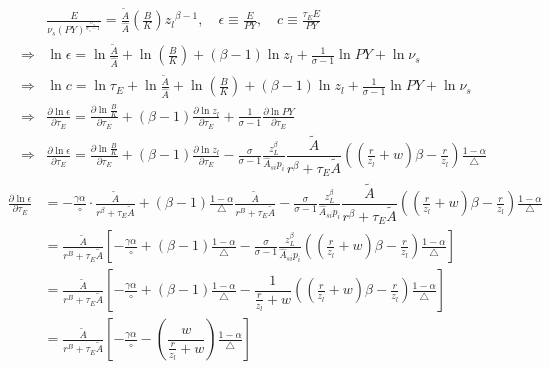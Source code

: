 \documentclass[12pt]{article} %
\begin{document}
\begin{enumerate}
    \begin{align*}
        & \frac{E}{\nu_{s}(PY)^{\frac{\sigma_s}{\sigma_s - 1}}}  = \frac{\tilde{A}}{\hat{A}}(\frac{B}{K}) {{z_l}}^{\beta-1} , \quad \epsilon \equiv  \frac{E}{PY}, \quad c \equiv \frac{\tau_E E}{PY}\\
        \Rightarrow & \ln \epsilon =  \ln \frac{\tilde{A}}{\hat{A}} + \ln(\frac{B}{K}) + (\beta-1) \ln {{z_l}} + \frac{1}{\sigma -1} \ln PY + \ln \nu_{s} \\
        \Rightarrow & \ln c = \ln \tau_E + \ln \frac{\tilde{A}}{\hat{A}} + \ln(\frac{B}{K}) + (\beta-1) \ln {{z_l}} + \frac{1}{\sigma -1} \ln PY + \ln \nu_{s}
        \\
        \Rightarrow & \frac{\partial \ln \epsilon}{\partial \tau_E} =   \frac{\partial \ln \frac{B}{K} }{\partial \tau_E} 
        + (\beta - 1) \frac{\partial \ln z_l }{\partial \tau_E} + \frac{1}{\sigma -1} \frac{\partial\ln PY }{\partial \tau_E}\\
        \Rightarrow & \frac{\partial \ln \epsilon}{\partial \tau_E} =   \frac{\partial \ln \frac{B}{K} }{\partial \tau_E}
        + (\beta - 1) \frac{\partial \ln z_l }{\partial \tau_E}  - \frac{\sigma}{\sigma -1}\frac{z_L^{\beta}}{\hat{A}_{si}p_i} \dfrac{\tilde{A}}{r^\beta+\tau_E \tilde{A}}
        ((\frac{r}{z_l} + w)\beta-\frac{r}{z_l} )\frac{1-\alpha}{\triangle}
    \end{align*}
    \begin{align*}
        \frac{\partial \ln \epsilon}{\partial \tau_E}  &=   - \frac{\gamma\alpha}{\circ} \cdot \frac{\tilde{A}}{r^\beta+\tau_E \tilde{A}}	
        + (\beta-1) \frac{1-\alpha}{\triangle}\frac{\tilde{A}}{r^B + \tau_E\tilde{A}}
        - \frac{\sigma}{\sigma -1}\frac{z_L^{\beta}}{\hat{A}_{si}p_i} \dfrac{\tilde{A}}{r^\beta+\tau_E \tilde{A}}
        ((\frac{r}{z_l} + w)\beta-\frac{r}{z_l} )\frac{1-\alpha}{\triangle}\\
        &= \frac{\tilde{A}}{r^B + \tau_E\tilde{A}}\left[
            -\frac{\gamma\alpha}{\circ} 
            + (\beta-1) \frac{1-\alpha}{\triangle} 
            - \frac{\sigma}{\sigma -1}\frac{z_L^{\beta}}{{\hat{A}_{si}}p_i} {((\frac{r}{z_l} + w)\beta-\frac{r}{z_l} )}\frac{1-\alpha}{\triangle}
        \right]\\
        &= \frac{\tilde{A}}{r^B + \tau_E\tilde{A}}\left[
            -\frac{\gamma\alpha}{\circ} 
            + (\beta-1) \frac{1-\alpha}{\triangle} 
            - \dfrac{1}{\frac{r}{z_l} + w} {((\frac{r}{z_l} + w)\beta-\frac{r}{z_l} )}\frac{1-\alpha}{\triangle}
        \right]\\
        & = \frac{\tilde{A}}{r^B + \tau_E\tilde{A}}\left[
            -\frac{\gamma\alpha}{\circ} 
            - (\dfrac{w}{\frac{r}{z_l} + w})\frac{1-\alpha}{\triangle}
        \right]
    \end{align*}


\end{enumerate}
\end{document}
